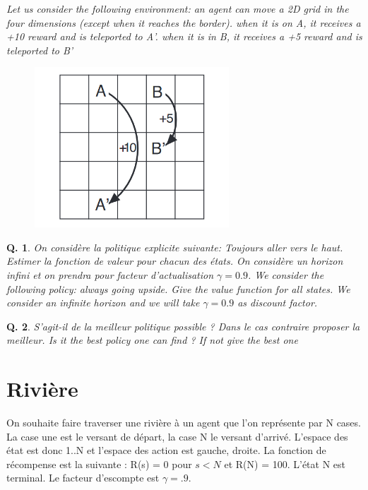 \documentclass[a4paper]{exam}
\newtheorem{question}{{\bf Q.}}[section]
\begin{document}
\em{Let us consider the following environment: an agent can move a 2D grid in the four dimensions (except when it reaches the border). when it is on A, it receives a +10 reward and is teleported to A'. when it is in B, it receives a +5 reward and is teleported to B'}

\begin{figure}[h]
	\begin{center}
		\includegraphics[height=6cm]{grille.png}
	\end{center}
\end{figure}


\begin{question}

On considère la politique explicite suivante: Toujours aller vers le haut. Estimer la fonction de valeur pour chacun des états. On considère un horizon infini et on prendra pour facteur d'actualisation $\gamma = 0.9$. \em{We consider the following policy: always going upside. Give the value function for all states. We consider an infinite horizon and we will take $\gamma=0.9$ as discount factor.}

\end{question}

\begin{question}
	S'agit-il de la meilleur politique possible ? Dans le cas contraire proposer la meilleur. \em{Is it the best policy one can find ? If not give the best one}
\end{question}

\section{Rivière}

On souhaite faire traverser une rivière à un agent que l'on représente par N cases. La case une est le versant de départ, la case N le versant d'arrivé. L'espace des état est donc {1..N} et l'espace des action est {gauche, droite}. La fonction de récompense est la suivante : R(s) = 0 pour $s < N$ et R(N) = 100. L'état N est terminal. Le facteur d'escompte est $\gamma = .9$.
\end{document}
